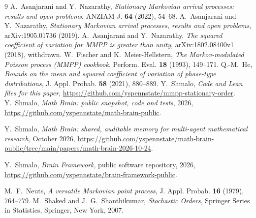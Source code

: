 \documentclass[11pt]{amsart}
\theoremstyle{remark}
\begin{document}
\begin{thebibliography}{9}
 A.~Asanjarani and Y.~Nazarathy, \emph{Stationary Markovian arrival processes: results and open problems}, ANZIAM J. \textbf{64} (2022), 54--68.
 A.~Asanjarani and Y.~Nazarathy, \emph{Stationary Markovian arrival processes, results and open problems}, arXiv:1905.01736 (2019).
 A.~Asanjarani and Y.~Nazarathy, \emph{The squared coefficient of variation for MMPP is greater than unity}, arXiv:1802.08400v1 (2018), withdrawn.
 W.~Fischer and K.~Meier-Hellstern, \emph{The Markov-modulated Poisson process (MMPP) cookbook}, Perform. Eval. \textbf{18} (1993), 149--171.
 Q.-M.~He, \emph{Bounds on the mean and squared coefficient of variation of phase-type distributions}, J. Appl. Probab. \textbf{58} (2021), 880--889.
 Y.~Shmalo, \emph{Code and Lean files for this paper}, \url{https://github.com/yspennstate/mmpp-stationary-order}.
 Y.~Shmalo, \emph{Math Brain: public snapshot, code and tests}, 2026, \url{https://github.com/yspennstate/math-brain-public}.

 Y.~Shmalo, \emph{Math Brain: shared, auditable memory for multi-agent mathematical research}, October 2026, \url{https://github.com/yspennstate/math-brain-public/tree/main/papers/math-brain-2026-10-24}.

 Y.~Shmalo, \emph{Brain Framework}, public software repository, 2026, \url{https://github.com/yspennstate/brain-framework-public}.

 M.~F.~Neuts, \emph{A versatile Markovian point process}, J. Appl. Probab. \textbf{16} (1979), 764--779.
 M.~Shaked and J.~G.~Shanthikumar, \emph{Stochastic Orders}, Springer Series in Statistics, Springer, New York, 2007.
\end{thebibliography}
\end{document}
